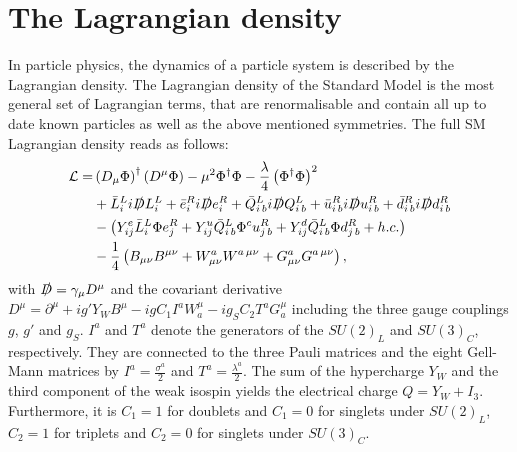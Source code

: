 \section{The Lagrangian density}
In particle physics, the dynamics of a particle system is described by the Lagrangian density.
The Lagrangian density of the Standard Model is the most general set of Lagrangian terms, that are renormalisable and contain all up to date known particles as well as the above mentioned symmetries.
The full SM Lagrangian density reads as follows:
\begin{equation}
\begin{split}
 \mathcal{L} =& \left( D_{\mu} \Phi \right)^{\dagger} \left( D^{\mu} \Phi \right) -\mu^2\Phi^{\dagger} \Phi -\frac{\lambda}{4} \left( \Phi^{\dagger} \Phi \right)^2\\
 & + \bar{L}^L_i i \slashed{D} L^{L}_i + \bar{e}^{R}_i i \slashed{D} e^{R}_i +  \bar{Q}^L_{i\,b} i \slashed{D} Q^L_{i\,b} + \bar{u}^{R}_{i\,b} i \slashed{D} u^{R}_{i\,b} +
\bar{d}^{R}_{i\,b} i \slashed{D} d^{R}_{i\,b}\\
& - \left( Y^e_{ij} \bar{L}^L_i \Phi e^R_j + Y^u_{ij} \bar{Q}^L_{i\,b} \Phi^c u^R_{j\,b} + Y^d_{ij} \bar{Q}^L_{i\,b} \Phi d^R_{j\,b} + h.c. \right)\\
& - \frac{1}{4} \left( B_{\mu\nu}  B^{\mu\nu} +  W^a_{\mu\nu} W^{a\,\mu\nu} +  G^a_{\mu\nu} G^{a\,\mu\nu}    \right),
\end{split}
\label{eq:LagrangianDensity}
\end{equation}
with $\slashed{D} = \gamma_{\mu} D^{\mu}$ and the covariant derivative $D^{\mu}=\partial^{\mu} + i g' Y_W B^{\mu} - i g C_1  I^a W_a^{\mu}  - i g_S C_2 T^a G_a^{\mu}$ including the three gauge couplings $g$, $g'$ and $g_S$.
$I^a$ and $T^a$ denote the generators of the $SU(2)_L$ and $SU(3)_C$, respectively.
They are connected to the three Pauli matrices and the eight Gell-Mann matrices by $I^a = \frac{\sigma^a}{2}$ and $T^a = \frac{\lambda^a}{2}$.
The sum of the hypercharge $Y_W$ and the third component of the weak isospin yields the electrical charge $Q=Y_W + I_3$.
Furthermore, it is $C_1=1 $ for doublets and $C_1=0$ for singlets under $SU(2)_L$, $C_2=1$ for triplets and $C_2=0 $ for singlets under $SU(3)_C$.  

